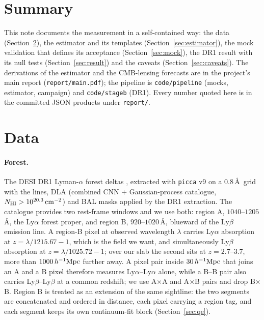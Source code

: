 \documentclass[11pt,a4paper]{article}
\newcommand{\Mpch}{\,h^{-1}{\rm Mpc}}
\begin{document}
\section{Summary}
This note documents the measurement in a self-contained way: the data (Section~\ref{sec:data}), the estimator and its templates (Section~\ref{sec:estimator}), the mock validation that defines its acceptance (Section~\ref{sec:mock}), the DR1 result with its null tests (Section~\ref{sec:result}) and the caveats (Section~\ref{sec:caveats}). The derivations of the estimator and the CMB-lensing forecasts are in the project's main report (\texttt{report/main.pdf}); the pipeline is \texttt{code/pipeline} (mocks, estimator, campaign) and \texttt{code/stageb} (DR1). Every number quoted here is in the committed JSON products under \texttt{report/}.

\section{Data}
\label{sec:data}
\paragraph{Forest.} The DESI DR1 Lyman-$\alpha$ forest deltas \citep{2503.14745,2306.06312}, extracted with \texttt{picca} v9 on a 0.8\,\AA\ grid with the lines, DLA (combined CNN + Gaussian-process catalogue, $N_{\rm HI}>10^{20.3}\,{\rm cm}^{-2}$) and BAL masks applied by the DR1 extraction. The catalogue provides two rest-frame windows and we use both: region A, $1040$--$1205$\,\AA, the Ly$\alpha$ forest proper, and region B, $920$--$1020$\,\AA, blueward of the Ly$\beta$ emission line. A region-B pixel at observed wavelength $\lambda$ carries Ly$\alpha$ absorption at $z=\lambda/1215.67-1$, which is the field we want, and simultaneously Ly$\beta$ absorption at $z=\lambda/1025.72-1$; over our slab the second sits at $z=2.7$--$3.7$, more than $1000\Mpch$ further away. A pixel pair inside $30\Mpch$ that joins an A and a B pixel therefore measures Ly$\alpha$--Ly$\alpha$ alone, while a B--B pair also carries Ly$\beta$--Ly$\beta$ at a common redshift; we use A$\times$A and A$\times$B pairs and drop B$\times$B. Region B is treated as an extension of the same sightline: the two segments are concatenated and ordered in distance, each pixel carrying a region tag, and each segment keeps its own continuum-fit block (Section~\ref{sec:qe}).
\end{document}
